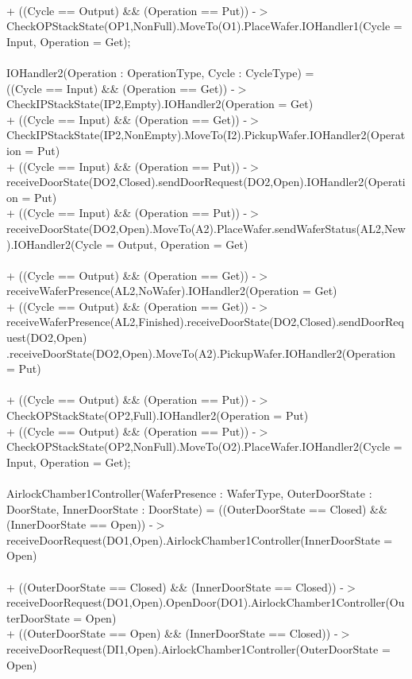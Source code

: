 \documentclass[a4paper,12pt]{article}
\begin{document}
\\+ ((Cycle == Output) \&\& (Operation == Put)) -$>$ CheckOPStackState(OP1,NonFull).MoveTo(O1).PlaceWafer.IOHandler1(Cycle = Input, Operation = Get);
\\
\\IOHandler2(Operation : OperationType, Cycle : CycleType) =
\\((Cycle == Input) \&\& (Operation == Get)) -$>$ CheckIPStackState(IP2,Empty).IOHandler2(Operation = Get)
\\+ ((Cycle == Input) \&\& (Operation == Get)) -$>$ CheckIPStackState(IP2,NonEmpty).MoveTo(I2).PickupWafer.IOHandler2(Operation = Put)
\\+ ((Cycle == Input) \&\& (Operation == Put)) -$>$ receiveDoorState(DO2,Closed).sendDoorRequest(DO2,Open).IOHandler2(Operation = Put)
\\+ ((Cycle == Input) \&\& (Operation == Put)) -$>$ receiveDoorState(DO2,Open).MoveTo(A2).PlaceWafer.sendWaferStatus(AL2,New).IOHandler2(Cycle = Output, Operation = Get)
\\
\\+ ((Cycle == Output) \&\& (Operation == Get)) -$>$ receiveWaferPresence(AL2,NoWafer).IOHandler2(Operation = Get)
\\+ ((Cycle == Output) \&\& (Operation == Get)) -$>$ receiveWaferPresence(AL2,Finished).receiveDoorState(DO2,Closed).sendDoorRequest(DO2,Open)
.receiveDoorState(DO2,Open).MoveTo(A2).PickupWafer.IOHandler2(Operation = Put)
\\
\\+ ((Cycle == Output) \&\& (Operation == Put)) -$>$ CheckOPStackState(OP2,Full).IOHandler2(Operation = Put)
\\+ ((Cycle == Output) \&\& (Operation == Put)) -$>$ CheckOPStackState(OP2,NonFull).MoveTo(O2).PlaceWafer.IOHandler2(Cycle = Input, Operation = Get);
\\
\\AirlockChamber1Controller(WaferPresence : WaferType, OuterDoorState : DoorState, InnerDoorState : DoorState) =
((OuterDoorState == Closed) \&\& (InnerDoorState == Open)) -$>$ receiveDoorRequest(DO1,Open).AirlockChamber1Controller(InnerDoorState = Open)
\\
\\+ ((OuterDoorState == Closed) \&\& (InnerDoorState == Closed)) -$>$ receiveDoorRequest(DO1,Open).OpenDoor(DO1).AirlockChamber1Controller(OuterDoorState = Open)
\\+ ((OuterDoorState == Open) \&\& (InnerDoorState == Closed)) -$>$ receiveDoorRequest(DI1,Open).AirlockChamber1Controller(OuterDoorState = Open)
\end{document}
